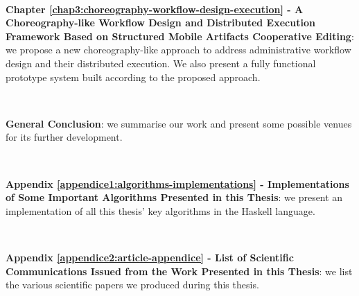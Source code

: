 ~

\noindent\textbf{Chapter \ref{chap3:choreography-workflow-design-execution} - A Choreography-like Workflow Design and Distributed Execution Framework Based on Structured Mobile Artifacts Cooperative Editing}: we propose a new choreography-like approach to address administrative workflow design and their distributed execution. We also present a fully functional prototype system built according to the proposed approach.


~

\noindent\textbf{General Conclusion}: we summarise our work and present some possible venues for its further development.


~

\noindent\textbf{Appendix \ref{appendice1:algorithms-implementations} - Implementations of Some Important Algorithms Presented in this Thesis}: we present an implementation of all this thesis' key algorithms in the Haskell language.


~

\noindent\textbf{Appendix \ref{appendice2:article-appendice} - List of Scientific Communications Issued from the Work Presented in this Thesis}: we list the various scientific papers we produced during this thesis.



\myCleanStarChapterEnd

